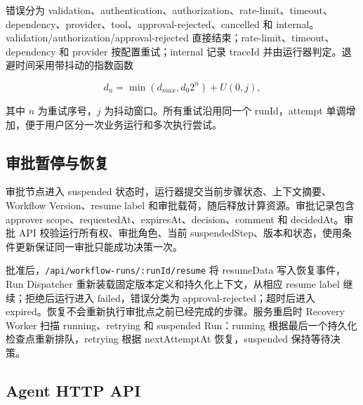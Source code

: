 \documentclass[conference,10pt]{IEEEtran}
\newcommand{\code}[1]{\texttt{#1}}
\begin{document}
错误分为 validation、authentication、authorization、rate-limit、timeout、dependency、provider、tool、approval-rejected、cancelled 和 internal。validation/authorization/approval-rejected 直接结束；rate-limit、timeout、dependency 和 provider 按配置重试；internal 记录 traceId 并由运行器判定。退避时间采用带抖动的指数函数

\begin{equation}
 d_n=\min(d_{max},d_0 2^n)+U(0,j),
\end{equation}

其中 $n$ 为重试序号，$j$ 为抖动窗口。所有重试沿用同一个 runId，attempt 单调增加，便于用户区分一次业务运行和多次执行尝试。

\subsection{审批暂停与恢复}

审批节点进入 suspended 状态时，运行器提交当前步骤状态、上下文摘要、Workflow Version、resume label 和审批载荷，随后释放计算资源。审批记录包含 approver scope、requestedAt、expiresAt、decision、comment 和 decidedAt。审批 API 校验运行所有权、审批角色、当前 suspendedStep、版本和状态，使用条件更新保证同一审批只能成功决策一次。

批准后，\code{/api/workflow-runs/:runId/resume} 将 resumeData 写入恢复事件，Run Dispatcher 重新装载固定版本定义和持久化上下文，从相应 resume label 继续；拒绝后运行进入 failed，错误分类为 approval-rejected；超时后进入 expired。恢复不会重新执行审批点之前已经完成的步骤。服务重启时 Recovery Worker 扫描 running、retrying 和 suspended Run：running 根据最后一个持久化检查点重新排队，retrying 根据 nextAttemptAt 恢复，suspended 保持等待决策。

\subsection{Agent HTTP API}
\end{document}

